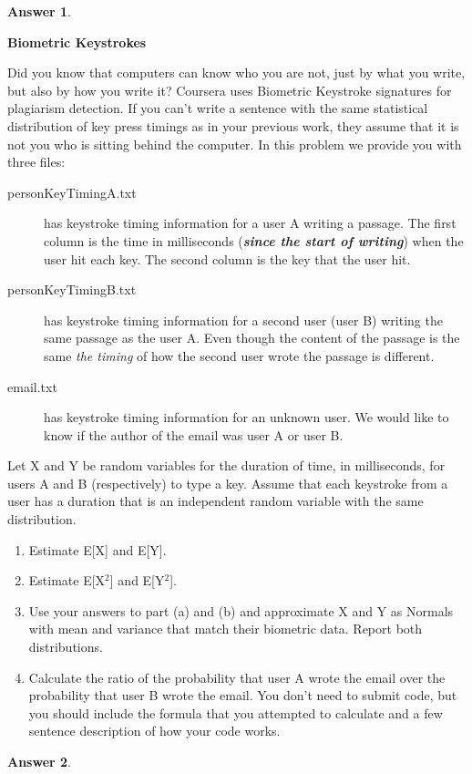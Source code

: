 \documentclass[12pt]{article}
\renewcommand{\(}{\left(}
\renewcommand{\)}{\right)}
\theoremstyle{definition}
\newtheorem*{answer}{Answer}
\begin{document}
\begin{enumerate}
{\begin{shaded}
\begin{answer}
    \end{answer}
    \end{shaded}
    \newpage
    \textbf{Biometric Keystrokes}
    \item Did you know that computers can know who you are not, just by what you write, but also by how you write it? Coursera uses Biometric Keystroke signatures for plagiarism detection. If you can't write a sentence with the same statistical distribution of key press timings as in your previous work, they assume that it is not you who is sitting behind the computer. In this problem we provide you with three files:\\
    \begin{description}
        \item[personKeyTimingA.txt] has keystroke timing information for a user A writing a passage. The first column is the time in milliseconds (\textbf{\textit{since the start of writing}}) when the user hit each key. The second column is the key that the user hit.
        \item[personKeyTimingB.txt] has keystroke timing information for a second user (user B) writing the same passage as the user A. Even though the content of the passage is the same \textit{the timing} of how the second user wrote the passage is different.
        \item[email.txt] has keystroke timing information for an unknown user. We would like to know if the author of the email was user A or user B.
    \end{description}
    Let X and Y be random variables for the duration of time, in milliseconds, for users A and B (respectively) to type a key. Assume that each keystroke from a user has a duration that is an independent random variable with the same distribution.
    \begin{enumerate}
        \item Estimate E[X] and E[Y].
        \item Estimate E[X$^2$] and E[Y$^2$].
        \item Use your answers to part (a) and (b) and approximate X and Y as Normals with mean and variance that match their biometric data. Report both distributions.
        \item Calculate the ratio of the probability that user A wrote the email over the probability that user B wrote the email. You don't need to submit code, but you should include the formula that you attempted to calculate and a few sentence description of how your code works.
    \end{enumerate}
    
    \begin{shaded}
    \begin{answer}
    
    \end{answer}
    \end{shaded}
    
}
\end{enumerate}
\end{document}
